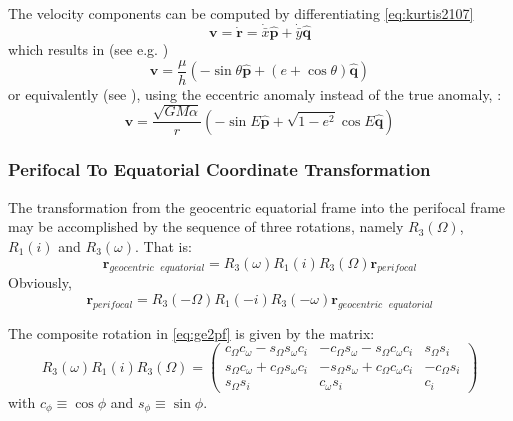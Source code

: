 The velocity components can be computed by differentiating \ref{eq:kurtis2107}
\begin{equation}
  \bm{v} = \dot{\bm{r}} = \dot{\bar{x}} \hat{\bm{p}} + \dot{\bar{y}} \hat{\bm{q}}
\end{equation}
which results in (see e.g. \cite{curtisb})
\begin{equation}
  \bm{v} = \frac{\mu}{h} \left( -\sin \theta \hat{\bm{p}}
    + (e + \cos \theta ) \hat{\bm{q}} \right)
\end{equation}
or equivalently (see \cite{Montenbruck2000}), using the eccentric anomaly 
instead of the true anomaly, :
\begin{equation}
  \bm{v} = \frac{\sqrt{G M \alpha }}{r} \left( -\sin E \hat{\bm{p}} 
   + \sqrt{1 - e^2} \cos E \hat{\bm{q}} \right)
\end{equation}

\subsubsection{Perifocal To Equatorial Coordinate Transformation}
The transformation from the geocentric equatorial frame into the perifocal frame
may be accomplished by the sequence of three rotations, namely $R_3(\Omega)$,
$R_1(i)$ and $R_3(\omega)$. That is:
\begin{equation}
  \label{eq:ge2pf}
  \bm{r}_{geocentric\text{ }equatorial} = R_3(\omega)  R_1(i)  R_3(\Omega) \bm{r}_{perifocal}
\end{equation}
Obviously, 
\begin{equation}
  \bm{r}_{perifocal} = R_3(-\Omega)  R_1(-i)  R_3(-\omega) \bm{r}_{geocentric\text{ }equatorial}
\end{equation}

The composite rotation in \ref{eq:ge2pf} is given by the matrix:
\begin{equation}
  R_3(\omega)  R_1(i)  R_3(\Omega) = 
  \begin{pmatrix}
    c_{\Omega} c_{\omega} - s_{\Omega} s_{\omega} c_{i} & 
      -c_{\Omega} s_{\omega} - s_{\Omega} c_{\omega} c_{i} &
      s_{\Omega} s_{i} \\
    s_{\Omega} c_{\omega} + c_{\Omega} s_{\omega} c_{i} &
      -s_{\Omega} s_{\omega} + c_{\Omega} c_{\omega} c_{i} &
      -c_{\Omega} s_{i} \\
    s_{\Omega} s_{i}                                    &
      c_{\omega} s_{i}                                  &
      c_{i}
  \end{pmatrix}
\end{equation}
with $c_{\phi} \equiv \cos \phi$ and $s_{\phi} \equiv \sin \phi$.

